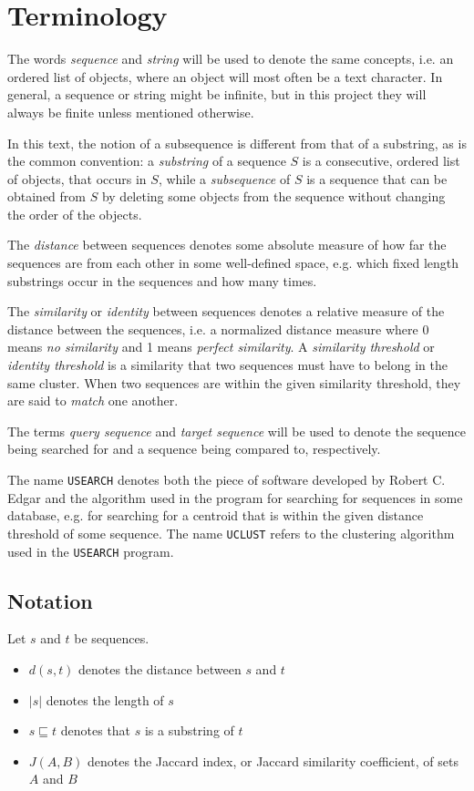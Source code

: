 \section{Terminology}

The words \emph{sequence} and \emph{string} will be used to denote the same
concepts, i.e. an ordered list of objects, where an object will most often be a
text character. In general, a sequence or string might be infinite, but in this
project they will always be finite unless mentioned otherwise.

In this text, the notion of a subsequence is different from that of a
substring, as is the common convention: a \emph{substring} of a sequence $S$ is
a consecutive, ordered list of objects, that occurs in $S$, while a
\emph{subsequence} of $S$ is a sequence that can be obtained from $S$ by
deleting some objects from the sequence without changing the order of the
objects.

The \emph{distance} between sequences denotes some absolute measure of how far
the sequences are from each other in some well-defined space, e.g. which fixed
length substrings occur in the sequences and how many times.

The \emph{similarity} or \emph{identity} between sequences denotes a relative
measure of the distance between the sequences, i.e. a normalized distance
measure where 0 means \emph{no similarity} and 1 means \emph{perfect
similarity}. A \emph{similarity threshold} or \emph{identity threshold} is a
similarity that two sequences must have to belong in the same cluster.  When
two sequences are within the given similarity threshold, they are said to
\emph{match} one another.

The terms \emph{query sequence} and \emph{target sequence} will be used to
denote the sequence being searched for and a sequence being compared to,
respectively.

The name \texttt{USEARCH} denotes both the piece of software developed by
Robert C. Edgar and the algorithm used in the program for searching for
sequences in some database, e.g. for searching for a centroid that is within
the given distance threshold of some sequence. The name \texttt{UCLUST} refers
to the clustering algorithm used in the \texttt{USEARCH} program.


\subsection{Notation}
Let $s$ and $t$ be sequences.
\begin{itemize}
  \item $d(s,t)$ denotes the distance between $s$ and $t$
  \item $|s|$ denotes the length of $s$
  \item $s \sqsubseteq t$ denotes that $s$ is a substring of $t$
  \item $J(A,B)$ denotes the Jaccard index, or Jaccard similarity coefficient,
    of sets $A$ and $B$
\end{itemize}
